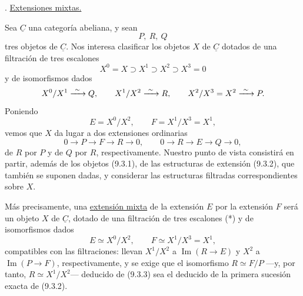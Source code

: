 
\medskip
{}. \underline{Extensiones mixtas.}

Sea $\underline C$ una categoría abeliana, y sean
\begin{equation}\tag{9.3.1}
 P,\ R,\ Q
\end{equation}
tres objetos de $\underline C$. Nos interesa clasificar los objetos $X$
de $\underline C$ dotados de una filtración de tres escalones
\begin{equation}\tag{*}
 X^0=X\supset X^1\supset X^2\supset X^3=0
\end{equation}
y de isomorfismos dados
\begin{equation*}
 X^0/X^1\xrightarrow{\ \sim\ }\sisi{P}{Q},
 \qquad X^1/X^2\xrightarrow{\ \sim\ }R,
 \qquad X^2/X^3=X^2\xrightarrow{\ \sim\ }\sisi{Q}{P}.
\end{equation*}
Poniendo
\begin{equation*}
 E=X^0/X^2,
 \qquad F=X^1/X^3=X^1,
\end{equation*}
vemos que $X$ da lugar a dos extensiones ordinarias
\begin{equation}\tag{9.3.2}
 0\longrightarrow P\longrightarrow F\longrightarrow R\longrightarrow0,
 \qquad
 0\longrightarrow R\longrightarrow E\longrightarrow Q\longrightarrow0,
\end{equation}
de $R$ por $P$ y de $Q$ por $R$, respectivamente. Nuestro punto de
vista consistirá en partir, además de los objetos (9.3.1), de las
estructuras de extensión (9.3.2), que también se suponen dadas, y
considerar las estructuras filtradas correspondientes sobre $X$.

Más precisamente, una \underline{extensión mixta} de la extensión $E$
por la extensión $F$ será un objeto $X$ de $\underline C$, dotado de
una filtración de tres escalones (*) y de isomorfismos dados
\begin{equation}\tag{9.3.3}
 E\simeq X^0/X^2,
 \qquad F\simeq X^1/X^3=X^1,
\end{equation}
compatibles con las filtraciones: llevan $X^1/X^2$ a
$\operatorname{Im}(R\longrightarrow E)$ y $X^2$ a
$\operatorname{Im}(P\longrightarrow F)$, respectivamente, y se exige
que el isomorfismo $R\simeq F/P$ —y, por tanto,
$R\simeq X^1/X^2$— deducido de (9.3.3) sea el deducido de la primera
sucesión exacta de (9.3.2).

